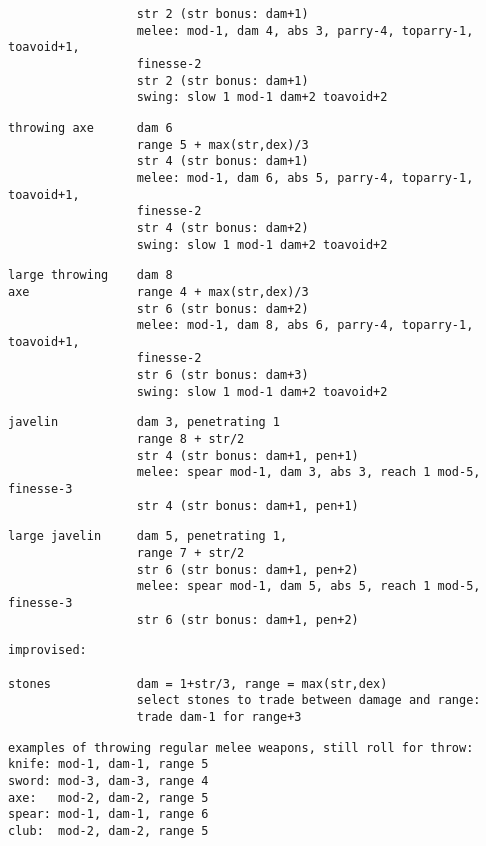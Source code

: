 \begin{samepage}
\begin{verbatim}
                  str 2 (str bonus: dam+1)
                  melee: mod-1, dam 4, abs 3, parry-4, toparry-1, toavoid+1,
                  finesse-2
                  str 2 (str bonus: dam+1)
                  swing: slow 1 mod-1 dam+2 toavoid+2
\end{verbatim} \blocklistgap \begin{verbatim}
throwing axe      dam 6
                  range 5 + max(str,dex)/3
                  str 4 (str bonus: dam+1)
                  melee: mod-1, dam 6, abs 5, parry-4, toparry-1, toavoid+1,
                  finesse-2
                  str 4 (str bonus: dam+2)
                  swing: slow 1 mod-1 dam+2 toavoid+2
\end{verbatim} \blocklistgap \begin{verbatim}
large throwing    dam 8
axe               range 4 + max(str,dex)/3
                  str 6 (str bonus: dam+2)
                  melee: mod-1, dam 8, abs 6, parry-4, toparry-1, toavoid+1,
                  finesse-2
                  str 6 (str bonus: dam+3)
                  swing: slow 1 mod-1 dam+2 toavoid+2
\end{verbatim} \blocklistgap \begin{verbatim}
javelin           dam 3, penetrating 1
                  range 8 + str/2
                  str 4 (str bonus: dam+1, pen+1)
                  melee: spear mod-1, dam 3, abs 3, reach 1 mod-5, finesse-3
                  str 4 (str bonus: dam+1, pen+1)
\end{verbatim} \blocklistgap \begin{verbatim}
large javelin     dam 5, penetrating 1,
                  range 7 + str/2
                  str 6 (str bonus: dam+1, pen+2)
                  melee: spear mod-1, dam 5, abs 5, reach 1 mod-5, finesse-3
                  str 6 (str bonus: dam+1, pen+2)
\end{verbatim} \blocklistgap \begin{verbatim}
improvised:

stones            dam = 1+str/3, range = max(str,dex)
                  select stones to trade between damage and range:
                  trade dam-1 for range+3
\end{verbatim} \blocklistgap \begin{verbatim}
examples of throwing regular melee weapons, still roll for throw:
knife: mod-1, dam-1, range 5
sword: mod-3, dam-3, range 4
axe:   mod-2, dam-2, range 5
spear: mod-1, dam-1, range 6
club:  mod-2, dam-2, range 5
\end{verbatim} \end{samepage} \normalsize \goodbreak

